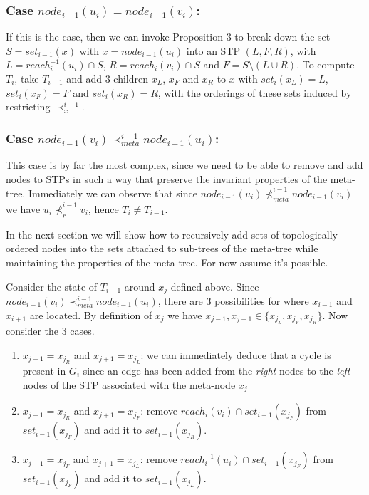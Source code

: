 \documentclass{article}
\begin{document}
\subsubsection{Case $node_{i-1}(u_{i}) = node_{i-1}(v_{i})$:}

If this is the case, then we can invoke Proposition 3 to break down the set $S=set_{i-1}(x)$ with $x=node_{i-1}(u_{i})$ into an STP $(L,F,R)$, with $L=reach_{i}^{-1}(u_{i}) \cap S$, $R=reach_{i}(v_{i}) \cap S$ and $F=S \setminus (L \cup R)$. To compute $T_{i}$, take $T_{i-1}$ and add 3 children $x_{L}$, $x_{F}$ and $x_{R}$ to $x$ with $set_{i}(x_{L}) = L$, $set_{i}(x_{F}) = F$ and $set_{i}(x_{R}) = R$, with the orderings of these sets induced by restricting $\prec_{x}^{i-1}$.

\subsubsection{Case $node_{i-1}(v_{i}) \prec_{meta}^{i-1} node_{i-1}(u_{i})$:}

This case is by far the most complex, since we need to be able to remove and add nodes to STPs in such a way that preserve the invariant properties of the meta-tree. Immediately we can observe that since $node_{i-1}(u_{i}) \nprec_{meta}^{i-1} node_{i-1}(v_{i})$ we have $u_{i} \nprec_{r}^{i-1} v_{i}$, hence $T_{i} \neq T_{i-1}$.

In the next section we will show how to recursively add sets of topologically ordered nodes into the sets attached to sub-trees of the meta-tree while maintaining the properties of the meta-tree. For now assume it's possible.

Consider the state of $T_{i-1}$ around $x_{j}$ defined above. Since $node_{i-1}(v_{i}) \prec_{meta}^{i-1} node_{i-1}(u_{i})$, there are 3 possibilities for where $x_{i-1}$ and $x_{i+1}$ are located. By definition of $x_{j}$ we have $x_{j-1}, x_{j+1} \in \{ x_{j_{L}}, x_{j_{F}}, x_{j_{R}} \}$. Now consider the 3 cases.

\begin{enumerate}
    \item $x_{j-1}=x_{j_{R}}$ and $x_{j+1}=x_{j_{L}}$: we can immediately deduce that a cycle is present in $G_{i}$ since an edge has been added from the \textit{right} nodes to the \textit{left} nodes of the STP associated with the meta-node $x_{j}$

    \item $x_{j-1}=x_{j_{R}}$ and $x_{j+1}=x_{j_{F}}$: remove $reach_{i}(v_{i}) \cap set_{i-1}(x_{j_{F}})$ from $set_{i-1}(x_{j_{F}})$ and add it to $set_{i-1}(x_{j_{R}})$.

    \item $x_{j-1}=x_{j_{F}}$ and $x_{j+1}=x_{j_{L}}$: remove $reach_{i}^{-1}(u_{i}) \cap set_{i-1}(x_{j_{F}})$ from $set_{i-1}(x_{j_{F}})$ and add it to $set_{i-1}(x_{j_{L}})$.
\end{enumerate}
\end{document}
